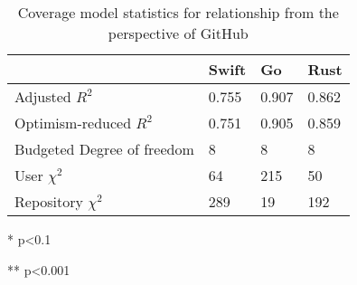 \begin{table}
\centering
\caption{Coverage model statistics for relationship from the perspective of GitHub}
\begin{threeparttable}
\begin{tabular}{|l|l|l|l|}
\hline
       & Swift & Go & Rust \\ \hline
    Adjusted $R^2$   &0.755  & 0.907 &0.862 \\ \hline
    Optimism-reduced $R^2$ & 0.751 &0.905  &0.859 \\ \hline
    Budgeted Degree of freedom & 8 & 8  &8 \\ \hline
    User $\chi^2$             & 64 \tnote{*} & 215\tnote{*} & 50\tnote{*}\\ \hline
    Repository $\chi^2$           & 289 \tnote{**}& 19\tnote{**} & 192\tnote{**} \\ \hline
\end{tabular}
\begin{tablenotes}
\item [*] p\textless 0.1 
\item [**] p\textless 0.001
\end{tablenotes}


\end{threeparttable}
\label{table:github_question relationship}
\end{table}


